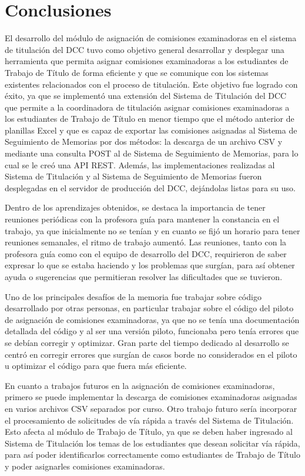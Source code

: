 \chapter{Conclusiones}
El desarrollo del módulo de asignación de comisiones examinadoras en el sistema de
titulación del DCC tuvo como objetivo general desarrollar y desplegar una herramienta que
permita asignar comisiones examinadoras a los estudiantes de Trabajo de Título de forma
eficiente y que se comunique con los sistemas existentes relacionados con el proceso de
titulación. Este objetivo fue logrado con éxito, ya que se implementó una extensión del
Sistema de Titulación del DCC que permite a la coordinadora de titulación asignar
comisiones examinadoras a los estudiantes de Trabajo de Título en menor tiempo que el
método anterior de planillas Excel y que es capaz de exportar las comisiones asignadas
al Sistema de Seguimiento de Memorias por dos métodos: la descarga de un archivo CSV y
mediante una consulta POST al de Sistema de Seguimiento de Memorias, para lo cual se le creó una API REST.
Además, las implementaciones realizadas al Sistema de Titulación y al Sistema de Seguimiento de Memorias
fueron desplegadas en el servidor de producción del DCC, dejándolas listas para su uso.

Dentro de los aprendizajes obtenidos, se destaca la importancia de tener reuniones periódicas
con la profesora guía para mantener la constancia en el trabajo, ya que inicialmente no
se tenían y en cuanto se fijó un horario para tener reuniones semanales, el ritmo de trabajo
aumentó. Las reuniones, tanto con la profesora guía como con el equipo de desarrollo del DCC,
requirieron de saber expresar lo que se estaba haciendo y los problemas que surgían, para así
obtener ayuda o sugerencias que permitieran resolver las dificultades que se tuvieron.

Uno de los principales desafíos de la memoria fue trabajar sobre código desarrollado por
otras personas, en particular trabajar sobre el código del piloto de asignación de
comisiones examinadoras, ya que no se tenía una documentación detallada del código y al
ser una versión piloto, funcionaba pero tenía errores que se debían corregir y
optimizar. Gran parte del tiempo dedicado al desarrollo se centró en corregir errores que
surgían de casos borde no considerados en el piloto u optimizar el código para que fuera
más eficiente.

En cuanto a trabajos futuros en la asignación de comisiones examinadoras,
primero se puede implementar la descarga de comisiones examinadoras asignadas en varios
archivos CSV separados por curso. Otro trabajo futuro sería incorporar el procesamiento
de solicitudes de vía rápida a través del Sistema de Titulación. Esto afecta al módulo de
Trabajo de Título, ya que se deben haber ingresado al Sistema de Titulación los temas de
los estudiantes que desean solicitar vía rápida, para así poder identificarlos correctamente
como estudiantes de Trabajo de Título y poder asignarles comisiones examinadoras.

